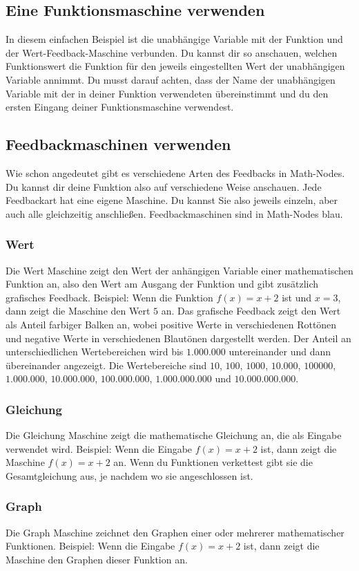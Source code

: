 \documentclass[12pt]{report}
\begin{document}
\subsection{Eine Funktionsmaschine verwenden}
In diesem einfachen Beispiel ist die unabhängige Variable mit der Funktion und der Wert-Feedback-Maschine verbunden. Du kannst dir so anschauen, welchen Funktionswert die Funktion für den jeweils eingestellten Wert der unabhängigen Variable annimmt. Du musst darauf achten, dass der Name der unabhängigen Variable mit der in deiner Funktion verwendeten übereinstimmt und du den ersten Eingang deiner Funktionsmaschine verwendest. 
\subsection{Feedbackmaschinen verwenden}
Wie schon angedeutet gibt es verschiedene Arten des Feedbacks in Math-Nodes. Du kannst dir deine Funktion also auf verschiedene Weise anschauen. Jede Feedbackart hat eine eigene Maschine. Du kannst Sie also jeweils einzeln, aber auch alle gleichzeitig anschließen. Feedbackmaschinen sind in Math-Nodes blau.
\subsubsection{Wert}
Die Wert Maschine zeigt den Wert der anhängigen Variable einer mathematischen Funktion an, also den Wert am Ausgang der Funktion und gibt zusätzlich grafisches Feedback. 
Beispiel: Wenn die Funktion $f(x) = x + 2$ ist und $x = 3$, dann zeigt die Maschine den Wert $5$ an. 
Das grafische Feedback zeigt den Wert als Anteil farbiger Balken an, wobei positive Werte in verschiedenen Rottönen und negative Werte in verschiedenen Blautönen dargestellt werden. Der Anteil an unterschiedlichen Wertebereichen wird bis $1.000.000$ untereinander und dann übereinander angezeigt. Die Wertebereiche sind $10$, $100$, $1000$, $10.000$, $100000$, $1.000.000$, $10.000.000$, $100.000.000$, $1.000.000.000$ und $10.000.000.000$.
\subsubsection{Gleichung}
Die Gleichung Maschine zeigt die mathematische Gleichung an, die als Eingabe verwendet wird. Beispiel: Wenn die Eingabe $f(x) = x + 2$ ist, dann zeigt die Maschine $f(x) = x + 2$ an. Wenn du Funktionen verkettest gibt sie die Gesamtgleichung aus, je nachdem wo sie angeschlossen ist.
\subsubsection{Graph}
Die Graph Maschine zeichnet den Graphen einer oder mehrerer mathematischer Funktionen. Beispiel: Wenn die Eingabe $f(x) = x + 2$ ist, dann zeigt die Maschine den Graphen dieser Funktion an.
\end{document}
